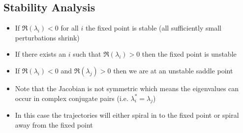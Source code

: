 \begin{slide}
\section{Stability Analysis}

\begin{PauseHighLight}
  \begin{itemize}
  \item If $\Re(\lambda_i) < 0$ for all $i$ the fixed point is stable
    (all sufficiently small perturbations shrink)\pause
  \item If there exists an $i$ such that $\Re(\lambda_i) > 0$ then the
    fixed point is unstable\pause
  \item If $\Re(\lambda_i) < 0$ and $\Re(\lambda_j) > 0$ then we are at
    an unstable saddle point\pause
  \item Note that the Jacobian is not symmetric which means the
    eigenvalues can occur in complex conjugate pairs
    (i.e. $\lambda_i^*=\lambda_j$)\pause
  \item In this case the trajectories will either spiral in to the fixed
    point or spiral away from the fixed point\pause
  \end{itemize}
\end{PauseHighLight}

\end{slide}


